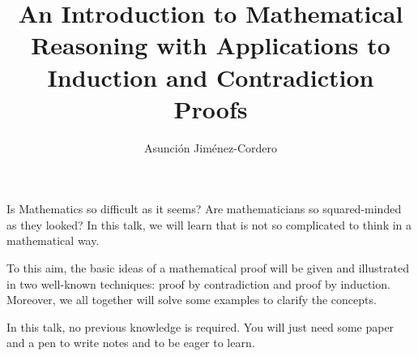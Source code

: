 \documentclass[a4paper,12pt]{article}
\begin{document}
\title{\bf An Introduction to Mathematical Reasoning with Applications to Induction and Contradiction Proofs}
\author{\Large Asunci\'on Jim\'enez-Cordero} 
    \date{}
  \maketitle
Is Mathematics so difficult as it seems? Are mathematicians so squared-minded as they looked? In this talk, we will learn that is not so complicated to think in a mathematical way.

To this aim, the basic ideas of a mathematical proof will be given and illustrated in two well-known techniques: proof by contradiction and proof by induction. Moreover, we all together will solve some examples to clarify the concepts.

In this talk, no previous knowledge is required. You will just need some paper and a pen to write notes and to be eager to learn.
\end{document}
